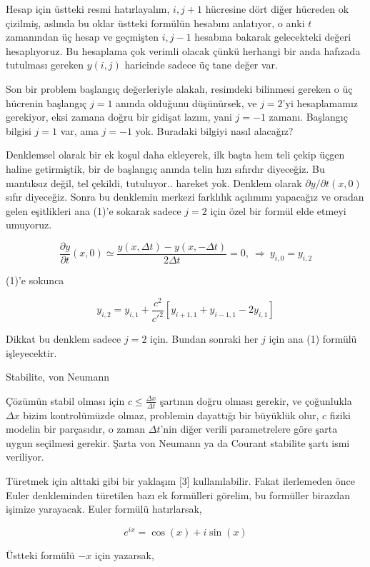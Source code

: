 \documentclass[12pt,fleqn]{article}\usepackage{../../common}
\begin{document}
Hesap için üstteki resmi hatırlayalım, $i,j+1$ hücresine dört diğer hücreden ok
çizilmiş, aslında bu oklar üstteki formülün hesabını anlatıyor, o anki $t$
zamanından üç hesap ve geçmişten $i,j-1$ hesabına bakarak gelecekteki değeri
hesaplıyoruz. Bu hesaplama çok verimli olacak çünkü herhangi bir anda hafızada
tutulması gereken $y(i,j)$ haricinde sadece üç tane değer var. 

Son bir problem başlangıç değerleriyle alakalı, resimdeki bilinmesi gereken o üç
hücrenin başlangıç $j=1$ anında olduğunu düşünürsek, ve $j=2$'yi hesaplamamız
gerekiyor, eksi zamana doğru bir gidişat lazım, yani $j=-1$ zamanı. Başlangıç
bilgisi $j=1$ var, ama $j=-1$ yok. Buradaki bilgiyi nasıl alacağız?

Denklemsel olarak bir ek koşul daha ekleyerek, ilk başta hem teli çekip üçgen
haline getirmiştik, bir de başlangıç anında telin hızı sıfırdır diyeceğiz. Bu
mantıksız değil, tel çekildi, tutuluyor.. hareket yok. Denklem olarak
$\partial y / \partial t(x,0)$ sıfır diyeceğiz. Sonra bu denklemin merkezi
farklılık açılımını yapacağız ve oradan gelen eşitlikleri ana (1)'e sokarak
sadece $j=2$ için özel bir formül elde etmeyi umuyoruz.

$$
\frac{\partial y}{\partial t}(x,0) \simeq
\frac{y(x, \Delta t)- y(x, -\Delta t)}{2\Delta t}=0, \
\Rightarrow \ y_{i, 0} = y_{i,2}
$$

(1)'e sokunca

$$
y_{i,2} = y_{i,1}+ \frac{c^2} {c'^2}
\left [ y_{i+1,1}+y_{i-1,1}-2 y_{i,1}\right]
$$

Dikkat bu denklem sadece $j=2$ için. Bundan sonraki her $j$ için ana (1) formülü
işleyecektir.

Stabilite, von Neumann

Çözümün stabil olması için $c \le \frac{\Delta x}{\Delta t}$ şartının doğru
olması gerekir, ve çoğunlukla $\Delta x$ bizim kontrolümüzde olmaz, problemin
dayattığı bir büyüklük olur, $c$ fiziki modelin bir parçasıdır, o zaman $\Delta t$'nin
diğer verili parametrelere göre şarta uygun seçilmesi gerekir. Şarta von
Neumann ya da Courant stabilite şartı ismi veriliyor.

Türetmek için alttaki gibi bir yaklaşım [3] kullanılabilir. Fakat ilerlemeden
önce Euler denkleminden türetilen bazı ek formülleri görelim, bu formüller
birazdan işimize yarayacak. Euler formülü hatırlarsak,

$$
e^{ix} = \cos (x) + i\sin(x)
$$

Üstteki formülü $-x$ için yazarsak,
\end{document}
